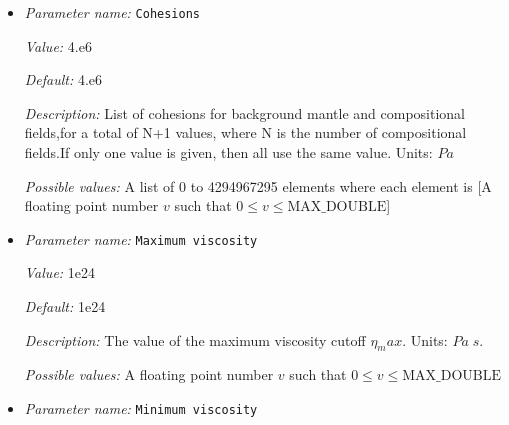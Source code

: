 \begin{itemize}
{\it Value:} 0.5


{\it Default:} 0.5


{\it Description:} List of coefficients of static friction for background mantle and compositional fields,for a total of N+1 values, where N is the number of compositional fields.If only one value is given, then all use the same value. Units: $dimensionless$


{\it Possible values:} A list of 0 to 4294967295 elements where each element is [A floating point number $v$ such that $0 \leq v \leq \text{MAX\_DOUBLE}$]
\item {\it Parameter name:} {\tt Cohesions}
\label{parameters:Material model/Dynamic Friction/Viscosities/Cohesions}
\label{parameters:Material_20model/Dynamic_20Friction/Viscosities/Cohesions}


{\it Value:} 4.e6


{\it Default:} 4.e6


{\it Description:} List of cohesions for background mantle and compositional fields,for a total of N+1 values, where N is the number of compositional fields.If only one value is given, then all use the same value. Units: $Pa$


{\it Possible values:} A list of 0 to 4294967295 elements where each element is [A floating point number $v$ such that $0 \leq v \leq \text{MAX\_DOUBLE}$]
\item {\it Parameter name:} {\tt Maximum viscosity}
\label{parameters:Material model/Dynamic Friction/Viscosities/Maximum viscosity}
\label{parameters:Material_20model/Dynamic_20Friction/Viscosities/Maximum_20viscosity}


{\it Value:} 1e24


{\it Default:} 1e24


{\it Description:} The value of the maximum viscosity cutoff $\eta_max$. Units: $Pa\;s$.


{\it Possible values:} A floating point number $v$ such that $0 \leq v \leq \text{MAX\_DOUBLE}$
\item {\it Parameter name:} {\tt Minimum viscosity}
\label{parameters:Material model/Dynamic Friction/Viscosities/Minimum viscosity}
\label{parameters:Material_20model/Dynamic_20Friction/Viscosities/Minimum_20viscosity}



\end{itemize}
